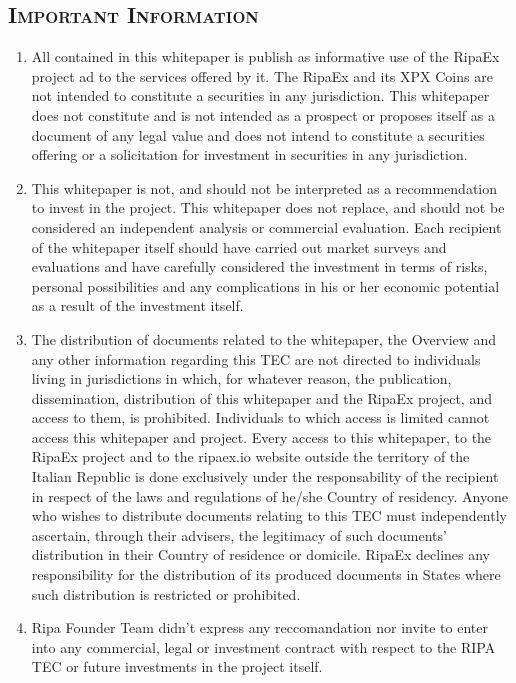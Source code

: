 \begin{scriptsize}
{		\section{\textsc{Important Information}}
		\begin{enumerate}
			\item All contained in this whitepaper is publish as informative use of the RipaEx project ad to the 
			services offered by it.
			The RipaEx and its XPX Coins are not intended to constitute a securities in any jurisdiction.
			This whitepaper does not constitute	and is not intended as a prospect or proposes itself
			as a document of any legal value and does not intend to constitute a securities offering or a
			solicitation for investment in securities in any jurisdiction.
			\item This whitepaper is not, and should not be interpreted as a recommendation to invest in the project. 
			This whitepaper does not replace, and should not be considered an independent analysis or commercial
			evaluation. Each recipient of the whitepaper itself	should have carried out market surveys and evaluations
			and have carefully considered the investment in terms of risks, personal possibilities and any complications in his or
			her economic potential as a result of the investment itself.
			\item The distribution of documents related to the whitepaper, the Overview and any other information 
			regarding this TEC are not directed to individuals living in jurisdictions in which, for whatever reason,
			the publication, dissemination, distribution of this whitepaper and the RipaEx project, and access to them,
			is prohibited. Individuals to which access is limited cannot access this whitepaper and project.
			Every access to this whitepaper, to the RipaEx project and to the ripaex.io website outside the 
			territory of the Italian Republic is done exclusively under the responsability of the recipient in 
			respect of the laws and regulations of he/she Country of residency.
			Anyone who wishes to distribute documents relating to this TEC must independently ascertain, through their
			advisers, the legitimacy of such documents’ distribution in their Country of residence or domicile. 
			RipaEx declines	any responsibility for the distribution of its produced	documents in States where such 
			distribution is restricted or prohibited.
			\item Ripa Founder Team didn't express any reccomandation nor invite to enter into any
			commercial, legal or investment contract with respect to the RIPA TEC or future investments in the project itself.

\end{enumerate}}
\end{scriptsize}
